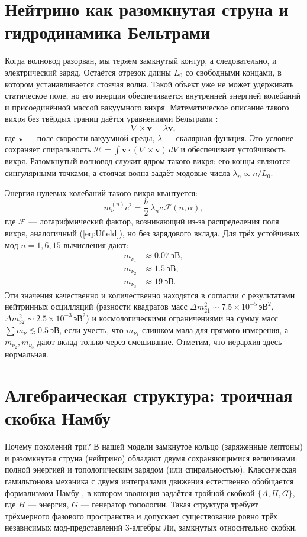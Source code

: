 \documentclass[12pt,a4paper]{article}
\begin{document}
	\section{Нейтрино как разомкнутая струна и гидродинамика Бельтрами}
	Когда волновод разорван, мы теряем замкнутый контур, а следовательно, и электрический заряд. Остаётся отрезок длины $L_0$ со свободными концами, в котором устанавливается стоячая волна. Такой объект уже не может удерживать статическое поле, но его инерция обеспечивается внутренней энергией колебаний и присоединённой массой вакуумного вихря. Математическое описание такого вихря без твёрдых границ даётся уравнениями Бельтрами \cite{Beltrami}:
	\begin{equation}
		\nabla\times\mathbf{v} = \lambda \mathbf{v},
	\end{equation}
	где $\mathbf{v}$ — поле скорости вакуумной среды, $\lambda$ — скалярная функция. Это условие сохраняет спиральность $\mathcal{H} = \int \mathbf{v}\cdot(\nabla\times\mathbf{v})\,dV$ и обеспечивает устойчивость вихря. Разомкнутый волновод служит ядром такого вихря: его концы являются сингулярными точками, а стоячая волна задаёт модовые числа $\lambda_n \propto n/L_0$.
	
	Энергия нулевых колебаний такого вихря квантуется:
	\begin{equation}
		m_\nu^{(n)} c^2 = \frac{\hbar}{2}\, \lambda_n c\,
		\mathcal{F}\!\left(n, \alpha\right),
	\end{equation}
	где $\mathcal{F}$ — логарифмический фактор, возникающий из-за распределения поля вихря, аналогичный (\ref{eq:Ufield}), но без зарядового вклада. Для трёх устойчивых мод $n=1,6,15$ вычисления дают:
	\begin{align}
		m_{\nu_1} &\approx 0.07\ \text{эВ},\\
		m_{\nu_2} &\approx 1.5\ \text{эВ},\\
		m_{\nu_3} &\approx 19\ \text{эВ}.
	\end{align}
	Эти значения качественно и количественно находятся в согласии с результатами нейтринных осцилляций (разности квадратов масс $\Delta m^2_{21}\sim 7.5\times10^{-5}\,\text{эВ}^2$, $\Delta m^2_{32}\sim 2.5\times10^{-3}\,\text{эВ}^2$) и космологическими ограничениями на сумму масс $\sum m_\nu \lesssim 0.5\ \text{эВ}$, если учесть, что $m_{\nu_1}$ слишком мала для прямого измерения, а $m_{\nu_2}, m_{\nu_3}$ дают вклад только через смешивание. Отметим, что иерархия здесь нормальная.
	
	\section{Алгебраическая структура: троичная скобка Намбу}
	Почему поколений три? В нашей модели замкнутое кольцо (заряженные лептоны) и разомкнутая струна (нейтрино) обладают двумя сохраняющимися величинами: полной энергией и топологическим зарядом (или спиральностью). Классическая гамильтонова механика с двумя интегралами движения естественно обобщается формализмом Намбу \cite{Nambu}, в котором эволюция задаётся тройной скобкой $\{A, H, G\}$, где $H$ — энергия, $G$ — генератор топологии. Такая структура требует трёхмерного фазового пространства и допускает существование ровно трёх независимых мод-представлений 3-алгебры Ли, замкнутых относительно скобки.
	
\end{document}

